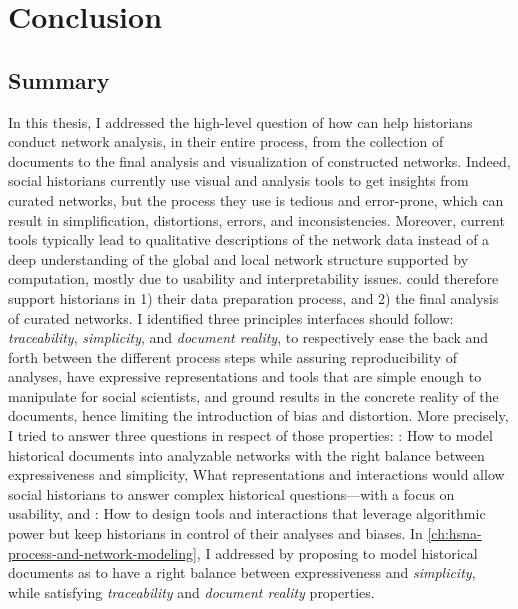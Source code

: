 \chapter{Conclusion}\label{ch:conclusion}
\minitoc

\section{Summary}

In this thesis, I addressed the high-level question of how \va can help historians conduct network analysis, in their entire process, from the collection of documents to the final analysis and visualization of constructed networks.
Indeed, social historians currently use visual and analysis tools to get insights from curated networks, but the process they use is tedious and error-prone, which can result in simplification, distortions, errors, and inconsistencies\cite{alkadi2022, lemercier12FormalNetwork2015}.
Moreover, current tools typically lead to qualitative descriptions of the network data\cite{rollingerProlegomenaProblemsPerspectives2020} instead of a deep understanding of the global and local network structure supported by computation, mostly due to usability and interpretability issues.
\va could therefore support historians in 1) their data preparation process, and 2) the final analysis of curated networks.
I identified three principles \va interfaces should follow: \emph{traceability}, \emph{simplicity}, and \emph{document reality}, to respectively ease the back and forth between the different process steps while assuring reproducibility of analyses, have expressive representations and tools that are simple enough to manipulate for social scientists, and ground results in the concrete reality of the documents, hence limiting the introduction of bias and distortion.
More precisely, I tried to answer three questions in respect of those properties: \qone:  How to model historical documents into analyzable networks with the right balance between expressiveness and simplicity, \qtwo What representations and interactions would allow social historians to answer complex historical questions---with a focus on usability, and \qthree: How to design \va tools and interactions that leverage algorithmic power but keep historians in control of their analyses and biases.
In \autoref{ch:hsna-process-and-network-modeling}, I addressed \qone by proposing to model historical documents as \modelplural to have a right balance between expressiveness and \emph{simplicity}, while satisfying \emph{traceability} and \emph{document reality} properties.
